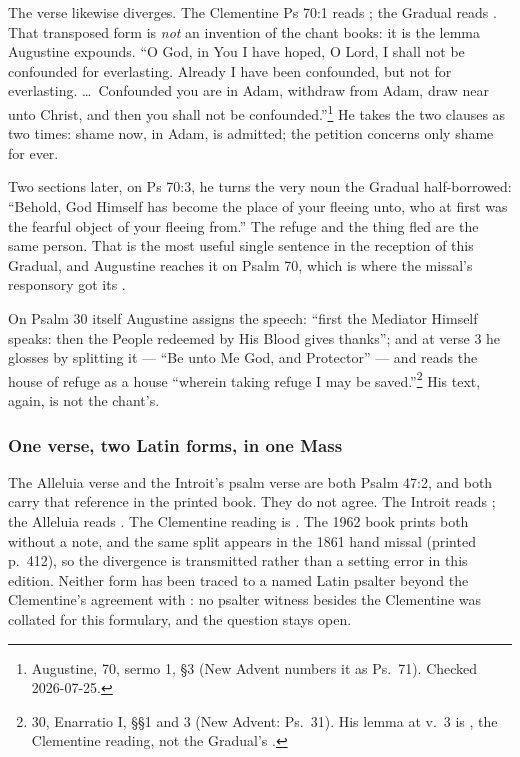 The verse likewise diverges. The Clementine Ps 70:1 reads ; the Gradual reads . That transposed form is \emph{not}
an invention of the chant books: it is the lemma Augustine expounds. ``O God,
in You I have hoped, O Lord, I shall not be confounded for everlasting. Already
I have been confounded, but not for everlasting. \dots\ Confounded you are in
Adam, withdraw from Adam, draw near unto Christ, and then you shall not be
confounded.''\footnote{Augustine,  70, sermo 1, §3 (New
Advent numbers it as Ps.\ 71). Checked 2026-07-25.} He takes the two clauses as
two times: shame now, in Adam, is admitted; the petition concerns only shame
for ever.

Two sections later, on Ps 70:3, he turns the very noun the Gradual
half-borrowed: ``Behold, God Himself has become the place of your fleeing unto,
who at first was the fearful object of your fleeing from.'' The refuge and the
thing fled are the same person. That is the most useful single sentence in the
reception of this Gradual, and Augustine reaches it on Psalm 70, which is where the missal's responsory got its .

On Psalm 30 itself Augustine assigns the speech: ``first the Mediator Himself
speaks: then the People redeemed by His Blood gives thanks''; and at verse 3 he
glosses  by splitting it --- ``Be unto Me
God, and Protector'' --- and reads the house of refuge as a house ``wherein
taking refuge I may be saved.''\footnote{ 30, Enarratio I,
§§1 and 3 (New Advent: Ps.\ 31). His lemma at v.\ 3 is , the Clementine reading, not the Gradual's .}
His text, again, is not the chant's.

\subsubsection*{One verse, two Latin forms, in one Mass}

The Alleluia verse and the Introit's psalm verse are both Psalm 47:2, and both
carry that reference in the printed book. They do not agree. The Introit reads
; the Alleluia reads . The
Clementine reading is . The 1962 book prints both without a note,
and the same split appears in the 1861 hand missal (printed p.\ 412), so the
divergence is transmitted rather than a setting error in this edition. Neither
form has been traced to a named Latin psalter beyond the Clementine's agreement
with : no psalter witness besides the Clementine was collated for
this formulary, and the question stays open.


